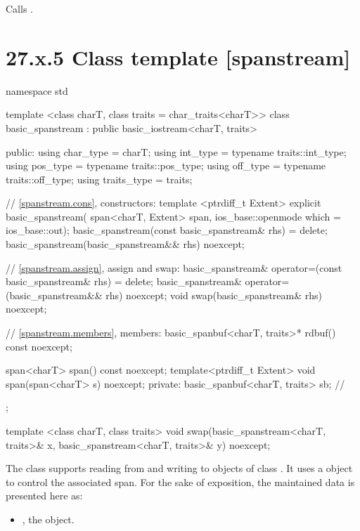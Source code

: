\documentclass[ebook,11pt,article]{memoir}
\begin{document}
\begin{itemdescr}
\pnum
\effects
Calls
.
\end{itemdescr}

\section{27.x.5 Class template  [spanstream] }

\begin{codeblock}
namespace std {
  template <class charT, class traits = char_traits<charT>>
  class basic_spanstream
    : public basic_iostream<charT, traits> {
  public:
    using char_type      = charT;
    using int_type       = typename traits::int_type;
    using pos_type       = typename traits::pos_type;
    using off_type       = typename traits::off_type;
    using traits_type    = traits;

    // \ref{spanstream.cons}, constructors:
    template <ptrdiff_t Extent>
    explicit basic_spanstream(
      span<charT, Extent> span,
      ios_base::openmode which = ios_base::out);
    basic_spanstream(const basic_spanstream& rhs) = delete;
    basic_spanstream(basic_spanstream&& rhs) noexcept;

    // \ref{spanstream.assign}, assign and swap:
    basic_spanstream& operator=(const basic_spanstream& rhs) = delete;
    basic_spanstream& operator=(basic_spanstream&& rhs) noexcept;
    void swap(basic_spanstream& rhs) noexcept;

    // \ref{spanstream.members}, members:
    basic_spanbuf<charT, traits>* rdbuf() const noexcept;

    span<charT> span() const noexcept;
	template<ptrdiff_t Extent>
    void span(span<charT> s) noexcept;
  private:
    basic_spanbuf<charT, traits> sb; // \expos
  };

  template <class charT, class traits>
    void swap(basic_spanstream<charT, traits>& x,
              basic_spanstream<charT, traits>& y) noexcept;
}
\end{codeblock}

\pnum
The class
supports reading from and writing to objects of class
.
It uses a
object to control the associated span.
For the sake of exposition, the maintained data is presented here as:
\begin{itemize}
\item
{}, the  object.
\end{itemize}
\end{document}
